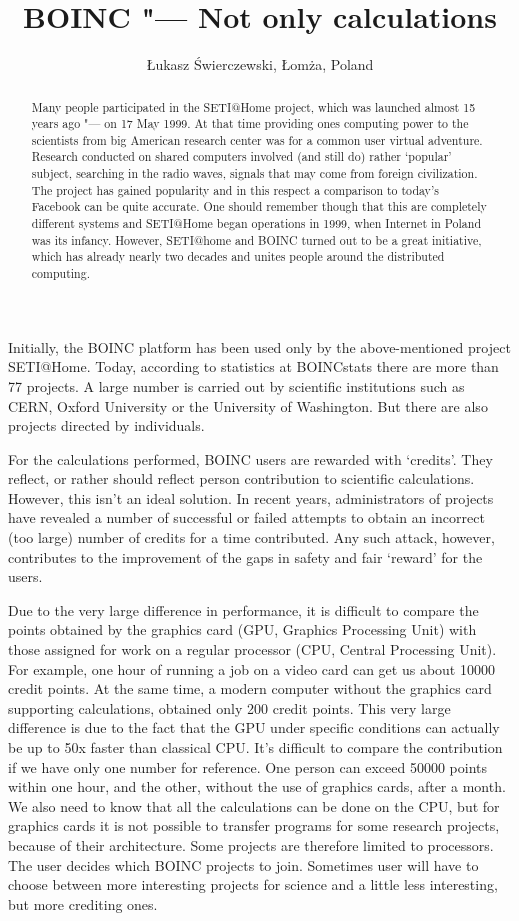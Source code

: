 \documentclass[10pt, a5paper]{article}
\begin{document}
\title{BOINC "--- Not only calculations}
\author{\L{}ukasz \'S{}wierczewski, \L{}om\.z{}a, Poland}
\maketitle
\begin{abstract}
Many people participated in the SETI@Home project, which was
launched almost 15 years ago "--- on 17 May 1999. At that time providing ones computing power to the scientists from big American research center was for a common user virtual adventure. Research conducted on shared computers involved (and still do) rather ‘popular’ subject, searching in the radio waves, signals that may come from foreign civilization. The project has gained popularity and in this respect a comparison to
today's Facebook can be quite accurate. One should remember though that this are completely different systems and SETI@Home began operations in 1999, when Internet in Poland was its infancy. However, SETI@home and BOINC turned out to be a great initiative, which has already nearly two decades and unites people around the distributed computing.
\end{abstract}
Initially, the BOINC platform has been used only by the above-mentioned project SETI@Home. Today, according to statistics at BOINCstats there are more than 77 projects. A large number is carried out by scientific institutions such as CERN, Oxford University or the University of Washington. But there are also projects directed by individuals.

For the calculations performed, BOINC users are rewarded with `credits'. They reflect, or rather should reflect person contribution to scientific calculations. However, this isn't an ideal solution. In recent years, administrators of projects have revealed a number of successful or failed attempts to obtain an incorrect (too large) number of credits for a time contributed. Any such attack, however, contributes to the improvement of the gaps in safety and fair `reward' for the users.

Due to the very large difference in performance, it is difficult to compare the points obtained by the graphics card (GPU, Graphics Processing Unit) with those assigned for work on a regular processor (CPU, Central Processing Unit). For example, one hour of running a job on a video card can get us about 10000 credit points. At the same time, a modern computer without the graphics card supporting calculations, obtained only 200 credit points. This very large difference is due to the fact that the GPU under specific conditions can actually be up to 50x faster than classical CPU. It's difficult to compare the contribution if we have only one number for reference. One person can exceed 50000 points within one hour, and the other, without the use of graphics cards, after a month. We also need to know that all the calculations can be done on the CPU, but for graphics cards it is not possible to transfer programs for some research projects, because of their architecture. Some projects are therefore limited to processors. The user decides which BOINC projects to join. Sometimes user  will have to choose between more interesting projects for science and a little less interesting, but more crediting ones.
\end{document}

